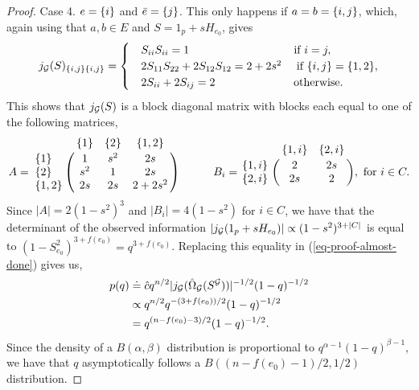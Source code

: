 \begin{proof}
    Case 4. $e = {\left\{i\right\}}$ and $\bar e = {\left\{j\right\}}$. This only happens if $a = b = {\left\{i, j\right\}}$, which, again using that $a, b \in E$ and $S = 1_p + sH_{e_0}$, gives
    \begin{equation*}
        j_\G(S)_{\eset{i, j} \eset{i, j}} = \begin{cases}
            &S_{i i}S_{i i} = 1\ \ \ \ \ \ \ \ \ \ \ \ \ \ \ \ \ \ \ \ \ \ \ \ \ \ \  \t{ if } i = j,\\
            &2S_{1 1}S_{2 2} + 2S_{1 2}S_{1 2} = 2 + 2s^2\ \ \ \t{ if } \eset{i, j} = \eset{1, 2},\\
            &2S_{ii} + 2S_{ij} = 2\ \ \ \ \ \ \ \ \ \ \ \ \ \ \ \ \ \ \ \  \t{ otherwise.}
        \end{cases}
    \end{equation*}
    This shows that $j_{\mathcal{G}}(S)$ is a block diagonal matrix with blocks each equal to one of the following matrices,
    \begin{equation*}
        A = \bordermatrix{~ & \eset{1} & \eset{2} & \eset{1, 2} \cr
            \eset{1} & 1 & s^2 & 2s \cr
            \eset{2} & s^2 & 1 & 2s \cr
            \eset{1, 2} & 2s & 2s & 2 + 2s^2 \cr
        }
        \ \ \ \ \ \ \ \ \ 
        B_i = \bordermatrix{~ & \eset{1, i} & \eset{2, i} \cr
            \eset{1, i} & 2 & 2s \cr
            \eset{2, i} & 2s & 2 \cr
        }, \t{ for } i \in C.
    \end{equation*}
    Since $|A| = 2 (1-s^2)^3$ and $|B_i| = 4(1-s^2)$ for $i \in C$, we have that the determinant of the observed information $\left|j_{\mathcal{G}}(1_p + sH_{e_0})\right| \propto (1-s^2)^{3 + |C|}$ is equal to $(1 - S_{e_0}^2)^{3 + f(e_0)} = q^{3 + f(e_0)}$. Replacing this equality in (\ref{eq-proof-almost-done}) gives us,
    \begin{align*}
        p(q) 
        &\doteq \hat c q^{n/2} |j_{{\mathcal{G}}}(\hat\Omega_{{\mathcal{G}}}(S^{{\mathcal{G}}})) |^{-1/2} (1 - q)^{-1/2}\\
        &\propto q^{n/2} q^{-(3 + f(e_0))/2} (1 - q)^{-1/2} \\
        &= q^{(n - f(e_0) - 3)/2}(1-q)^{-1/2}.
    \end{align*}
    Since the density of a $B(\alpha, \beta)$ distribution is proportional to $q^{\alpha-1}(1-q)^{\beta-1}$, we have that $q$ asymptotically follows a $B((n - f(e_0) - 1)/2, 1/2)$ distribution.
\end{proof}

